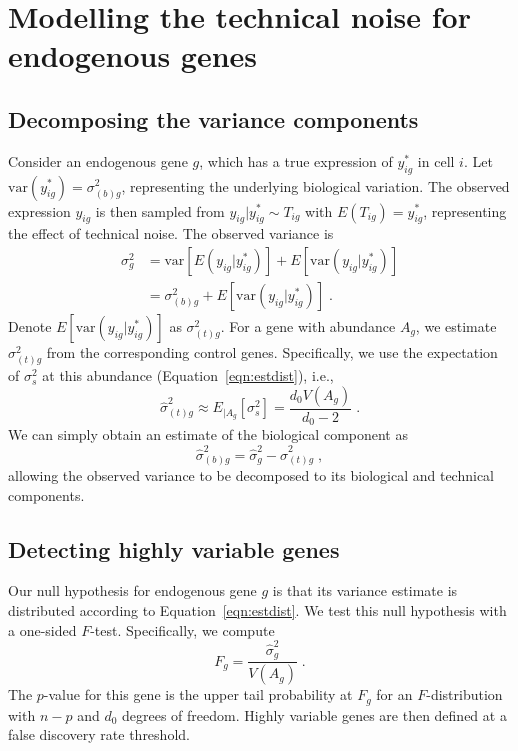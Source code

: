 \documentclass{article}
\begin{document}
\section{Modelling the technical noise for endogenous genes}

\subsection{Decomposing the variance components}
Consider an endogenous gene $g$, which has a true expression of $y_{ig}^*$ in cell $i$.
Let $\mbox{var}(y_{ig}^*) = \sigma^2_{(b)g}$, representing the underlying biological variation.
The observed expression $y_{ig}$ is then sampled from $y_{ig}|y_{ig}^* \sim T_{ig}$ with $E(T_{ig}) = y^*_{ig}$, representing the effect of technical noise.
The observed variance is 
\begin{align*}
    \sigma^2_g &= \mbox{var}[E(y_{ig}|y_{ig}^*)] + E[\mbox{var}(y_{ig}|y_{ig}^*)] \\
               &= \sigma^2_{(b)g} +  E[\mbox{var}(y_{ig}|y_{ig}^*)]  \;.
\end{align*}
Denote $E[\mbox{var}(y_{ig}|y_{ig}^*)]$ as $\sigma^2_{(t)g}$.
For a gene with abundance $A_g$, we estimate $\sigma^2_{(t)g}$ from the corresponding control genes.
Specifically, we use the expectation of $\sigma^2_s$ at this abundance (Equation~\ref{eqn:estdist}), i.e., 
\begin{equation}
    \hat\sigma^2_{(t)g} \approx E_{|A_g}[\sigma^2_s] = \frac{d_0V(A_g)}{d_0-2} \;. \label{eqn:techest}
\end{equation}
We can simply obtain an estimate of the biological component as
\[
    \hat\sigma^2_{(b)g} = \hat\sigma^2_g - \hat\sigma^2_{(t)g} \;,
\]
allowing the observed variance to be decomposed to its biological and technical components.

\subsection{Detecting highly variable genes}
Our null hypothesis for endogenous gene $g$ is that its variance estimate is distributed according to Equation~\ref{eqn:estdist}.
We test this null hypothesis with a one-sided $F$-test.
Specifically, we compute
\[
    F_g = \frac{\hat\sigma^2_g}{V(A_g)} \;.
\]
The $p$-value for this gene is the upper tail probability at $F_g$ for an $F$-distribution with $n-p$ and $d_0$ degrees of freedom.
Highly variable genes are then defined at a false discovery rate threshold.
\end{document}

